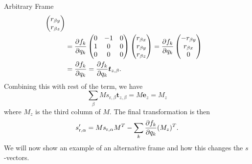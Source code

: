 \documentclass{article}
\newcommand{\vect}[1]{\boldsymbol{#1}}
\begin{document}
\begin{subsection}{Arbitrary Frame}
\[\begin{split}
\begin{pmatrix}
			r_{\beta y} \\
			r_{\beta z} \\
			\end{pmatrix} \\
   &= \pdv{f_k}{q_k}   \begin{pmatrix}
                 0 & -1 & 0 \\
                 1 & 0 & 0 \\
                 0 & 0 & 0 \\
             \end{pmatrix}
             \begin{pmatrix}
                 r_{\beta x} \\
                 r_{\beta y} \\
                 r_{\beta z} \\
             \end{pmatrix}  = 
			\pdv{f_k}{q_k} \begin{pmatrix}
                 -r_{\beta y} \\
                 r_{\beta x} \\
                 0 \\ 
             \end{pmatrix} \\
		 &= \pdv{f_k}{q_k} (\vect{e}_z \times \vect{r}_\beta) = \pdv{f_k}{q_k} \vect{t}_{z, \beta}. \\
	\end{split}
\]
	Combining this with rest of the term, we have
	\[
		\sum_\beta M s_{\text{r}, \beta} \vect{t}_{z, \beta} = M \vect{e}_z = M_z
	\]
where $M_z$ is the third column of $M$. The final transformation is then 
	\[
		s'_{\text{r}, \alpha} = Ms_{\text{r}, \alpha} M^T - \sum_k \pdv{f_k}{q_k} (M\vect{s}_{k,\alpha})(M_z)^T.
	\]
We will now show an example of an alternative frame and how this changes the $s$-vectors. 
\end{subsection}
\end{document}
